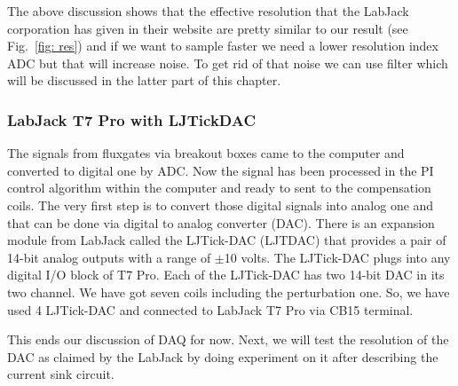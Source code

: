 \FloatBarrier
The above discussion shows that the effective resolution that the LabJack corporation has given in their website are pretty similar to our result (see Fig.~\ref{fig: res}) and if we want to sample faster we need a lower resolution index ADC but that will increase noise. To get rid of that noise we can use filter which will be discussed in the latter part of this chapter.

\subsubsection{LabJack T7 Pro with LJTickDAC}
The signals from fluxgates via breakout boxes came to the computer and converted to digital one by ADC. Now the signal has been processed in the PI control algorithm within the computer and ready to sent to the compensation coils. The very first step is to convert those digital signals into analog one and that can be done via digital to analog converter (DAC). There is an expansion module from LabJack called the LJTick-DAC (LJTDAC) that provides a pair of 14-bit analog outputs with a range of $\pm$10 volts. The LJTick-DAC plugs into any digital I/O block of T7 Pro. Each of the LJTick-DAC has two 14-bit DAC in its two channel. We have got seven coils including the perturbation one. So, we have used 4 LJTick-DAC and connected to LabJack T7 Pro via CB15 terminal. 





This ends our discussion of DAQ for now. Next, we will test the resolution of the DAC as claimed by the LabJack by doing experiment on it after describing the current sink circuit.


